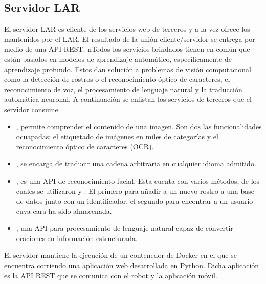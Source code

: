 


\subsection{Servidor LAR}
\label{\detokenize{chapter_two/desc_cloudnao:servidor-lar}}
El servidor LAR es cliente de los servicios web de terceros y a la vez
ofrece los mantenidos por el LAR.
El resultado de la unión cliente/servidor se
entrega por medio de una
API REST.
nTodos los servicios brindados tienen en común que están basados en modelos de
aprendizaje automático, específicamente de aprendizaje profundo. Estos dan solución
a problemas de visión computacional como la detección de rostros o el
reconocimiento óptico de caracteres, el reconocimiento
de voz, el procesamiento de lenguaje natural y la traducción automática
neuronal. A continuación se enlistan los servicios de terceros que el servidor
consume.
\begin{itemize}
\item {} 
, permite comprender el contenido de una imagen. Son dos las funcionalidades ocuapadas; el etiquetado de imágenes en miles de categorías y el reconocimiento óptico de caracteres (OCR).


\item {} 
, se encarga de traducir una cadena arbitraria en cualquier idioma admitido.

\item {} 
, es una API de reconocimiento facial. Esta cuenta con varios métodos, de los cuales se utilizaron  y . El primero para añadir a un nuevo rostro a una base de datos junto con un identificador, el segundo para encontrar a un usuario cuya cara ha sido almacenada.

\item {} 
, una API para procesamiento de lenguaje natural capaz de convertir oraciones en información estructurada.

\end{itemize}

El servidor mantiene la ejecución de un contenedor de
Docker en el que se encuentra corriendo una aplicación web desarrollada en Python.
Dicha aplicación es la API REST que se comunica con el robot y la aplicación móvil.

